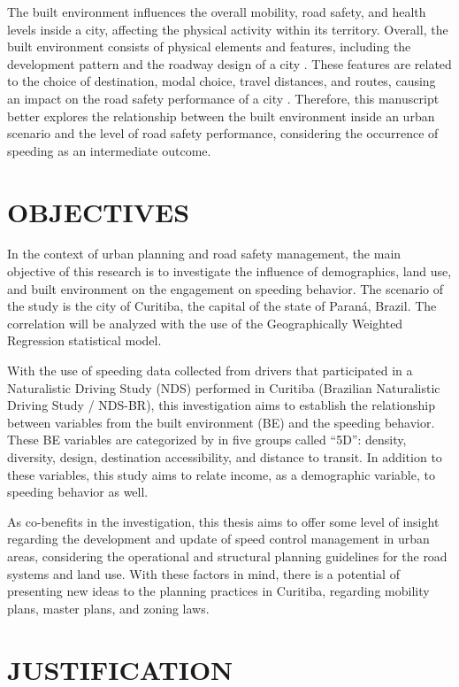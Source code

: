 The built environment influences the overall mobility, road safety, and health levels inside a city, affecting the physical activity within its territory. Overall, the built environment consists of physical elements and features, including the development pattern and the roadway design of a city \cite{Ewing2010}. These features are related to the choice of destination, modal choice, travel distances, and routes, causing an impact on the road safety performance of a city \cite{Tiwari}. Therefore, this manuscript better explores the relationship between the built environment inside an urban scenario and the level of road safety performance, considering the occurrence of speeding as an intermediate outcome.

\section{OBJECTIVES}

In the context of urban planning and road safety management, the main objective of this research is to investigate the influence of demographics, land use, and built environment on the engagement on speeding behavior. The scenario of the study is the city of Curitiba, the capital of the state of Paraná, Brazil. The correlation will be analyzed with the use of the Geographically Weighted Regression statistical model.

With the use of speeding data collected from drivers that participated in a Naturalistic Driving Study (NDS) performed in Curitiba (Brazilian Naturalistic Driving Study / NDS-BR), this investigation aims to establish the relationship between variables from the built environment (BE) and the speeding behavior. These BE variables are categorized by \textcite{Ewing2009} in five groups called ``5D'': density, diversity, design, destination accessibility, and distance to transit. In addition to these variables, this study aims to relate income, as a demographic variable, to speeding behavior as well.

As co-benefits in the investigation, this thesis aims to offer some level of insight regarding the development and update of speed control management in urban areas, considering the operational and structural planning guidelines for the road systems and land use. With these factors in mind, there is a potential of presenting new ideas to the planning practices in Curitiba, regarding mobility plans, master plans, and zoning laws.
    
\section{JUSTIFICATION}

